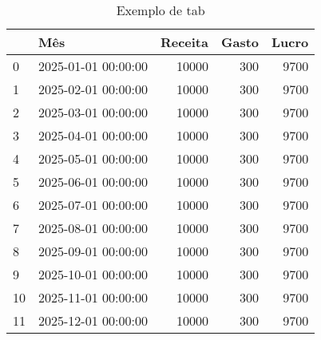 \begin{table}[!h]
\caption{Exemplo de tab}
\begin{tabular}{llrrr}
\toprule
 & Mês & Receita & Gasto & Lucro \\
\midrule
0 & 2025-01-01 00:00:00 & 10000 & 300 & 9700 \\
1 & 2025-02-01 00:00:00 & 10000 & 300 & 9700 \\
2 & 2025-03-01 00:00:00 & 10000 & 300 & 9700 \\
3 & 2025-04-01 00:00:00 & 10000 & 300 & 9700 \\
4 & 2025-05-01 00:00:00 & 10000 & 300 & 9700 \\
5 & 2025-06-01 00:00:00 & 10000 & 300 & 9700 \\
6 & 2025-07-01 00:00:00 & 10000 & 300 & 9700 \\
7 & 2025-08-01 00:00:00 & 10000 & 300 & 9700 \\
8 & 2025-09-01 00:00:00 & 10000 & 300 & 9700 \\
9 & 2025-10-01 00:00:00 & 10000 & 300 & 9700 \\
10 & 2025-11-01 00:00:00 & 10000 & 300 & 9700 \\
11 & 2025-12-01 00:00:00 & 10000 & 300 & 9700 \\
\bottomrule
\end{tabular}

\fonte
\end{table}